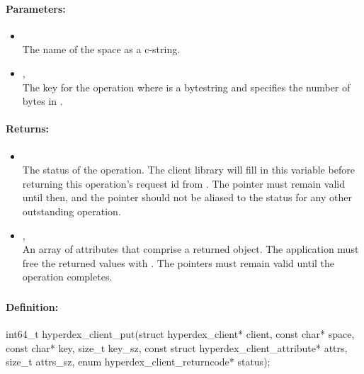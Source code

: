 \paragraph{Parameters:}
\begin{itemize}[noitemsep]
\item {}\\
The name of the space as a c-string.
\item {}, \\
The key for the operation where  is a bytestring and  specifies the number of bytes in .
\end{itemize}

\paragraph{Returns:}
\begin{itemize}[noitemsep]
\item {}\\
The status of the operation.  The client library will fill in this variable before returning this operation's request id from .  The pointer must remain valid until then, and the pointer should not be aliased to the status for any other outstanding operation.
\item {}, \\
An array of attributes that comprise a returned object.  The application must free the returned values with .  The pointers must remain valid until the operation completes.
\end{itemize}

\pagebreak
\subsubsection{}
\label{api:c:put}


\paragraph{Definition:}
\begin{ccode}
int64_t hyperdex_client_put(struct hyperdex_client* client,
        const char* space,
        const char* key, size_t key_sz,
        const struct hyperdex_client_attribute* attrs, size_t attrs_sz,
        enum hyperdex_client_returncode* status);
\end{ccode}

